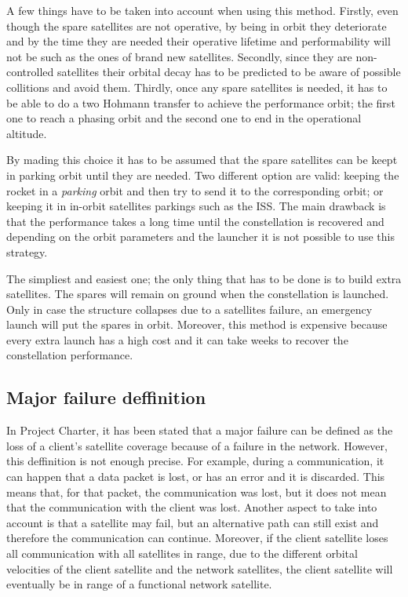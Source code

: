 A few things have to be taken into account when using this method. Firstly, even though the spare satellites are not operative, by being in orbit they deteriorate and by the time they are needed their operative lifetime and performability will not be such as the ones of brand new satellites. Secondly, since they are non-controlled satellites their orbital decay has to be predicted to be aware of possible collitions and avoid them. Thirdly, once any spare satellites is needed, it has to be able to do a two Hohmann transfer to achieve the performance orbit; the first one to reach a phasing orbit and the second one to end in the operational altitude.

By mading this choice it has to be assumed that the spare satellites can be keept in parking orbit until they are needed. Two different option are valid: keeping the rocket in a \textit{parking} orbit and then try to send it to the corresponding orbit; or keeping it in in-orbit satellites parkings such as the ISS. The main drawback is that the performance takes a long time until the constellation is recovered and depending on the orbit parameters and the launcher it is not possible to use this strategy.  

The simpliest and easiest one; the only thing that has to be done is to build extra satellites. The spares will remain on ground when the constellation is launched. Only in case the structure collapses due to a satellites failure, an emergency launch will put the spares in orbit. Moreover, this method is expensive because every extra launch has a high cost and it can take weeks to recover the constellation performance. 

\subsection{Major failure deffinition}
In Project Charter, it has been stated that a major failure can be defined as the loss of a client’s satellite coverage because of a failure in the network. However, this deffinition is not enough precise. For example, during a communication, it can happen that a data packet is lost, or has an error and it is discarded. This means that, for that packet, the communication was lost, but it does not mean that the communication with the client was lost. Another aspect to take into account is that a satellite may fail, but an alternative path can still exist and therefore the communication can continue. Moreover, if the client satellite loses all communication with all satellites in range, due to the different orbital velocities of the client satellite and the network satellites, the client satellite will eventually be in range of a functional network satellite.

